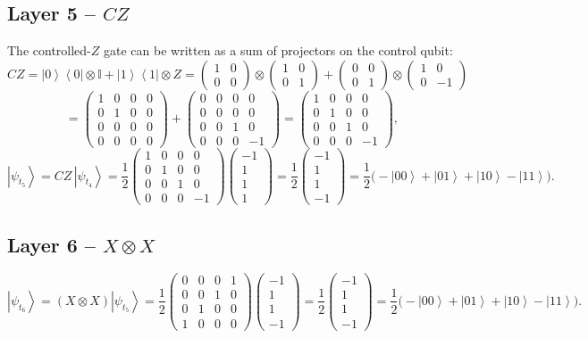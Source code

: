 \documentclass[11pt,a4paper]{article}
\newcommand{\ket}[1]{\left|#1\right\rangle}
\newcommand{\bra}[1]{\left\langle#1\right|}
\newcommand{\psit}[1]{\ket{\psi_{t_{#1}}}}
\newcommand{\XX}{\begin{pmatrix} 0 & 0 & 0 & 1\\ 0 & 0 & 1 & 0\\ 0 & 1 & 0 & 0\\ 1 & 0 & 0 & 0 \end{pmatrix}}
\newcommand{\CZ}{\begin{pmatrix} 1 & 0 & 0 & 0\\ 0 & 1 & 0 & 0\\ 0 & 0 & 1 & 0\\ 0 & 0 & 0 & -1 \end{pmatrix}}
\begin{document}
\subsection*{Layer 5 -- $CZ$}
The controlled-$Z$ gate can be written as a sum of projectors on the control qubit:
\[
CZ = \ket{0}\bra{0}\otimes\mathbb{I} + \ket{1}\bra{1}\otimes Z
= \begin{pmatrix}1&0\\0&0\end{pmatrix}\otimes\begin{pmatrix}1&0\\0&1\end{pmatrix}
+ \begin{pmatrix}0&0\\0&1\end{pmatrix}\otimes\begin{pmatrix}1&0\\0&-1\end{pmatrix}
\]
\[
= \begin{pmatrix}1&0&0&0\\0&1&0&0\\0&0&0&0\\0&0&0&0\end{pmatrix}
+ \begin{pmatrix}0&0&0&0\\0&0&0&0\\0&0&1&0\\0&0&0&-1\end{pmatrix}
= \CZ,
\]
\[
\psit{5} = CZ\,\psit{4} = \frac12\CZ\begin{pmatrix}-1\\1\\1\\1\end{pmatrix}
= \frac12\begin{pmatrix}-1\\1\\1\\-1\end{pmatrix}
= \frac12\big(-\ket{00}+\ket{01}+\ket{10}-\ket{11}\big).
\]

\subsection*{Layer 6 -- $X\otimes X$}
\[
\psit{6} = (X\otimes X)\psit{5} = \frac12\XX\begin{pmatrix}-1\\1\\1\\-1\end{pmatrix}
= \frac12\begin{pmatrix}-1\\1\\1\\-1\end{pmatrix}
= \frac12\big(-\ket{00}+\ket{01}+\ket{10}-\ket{11}\big).
\]
\end{document}
